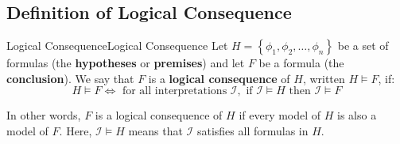 \documentclass[a4paper]{article}
\theoremstyle{definition}
\begin{document}
\subsection{Definition of Logical Consequence}
\begin{definition}{Logical Consequence}{Logical Consequence}
Let \( H = \left\{ \phi_1, \phi_2, \ldots, \phi_n \right\} \) be a set of formulas (the \textbf{hypotheses} or \textbf{premises}) and let 
\( F \) be a formula (the \textbf{conclusion}). We say that \( F \) is a \textbf{logical consequence} of \( H \), written \( H \models F \), if:
\[
  H \models F \Leftrightarrow \text{ for all interpretations } \mathcal{I}, \text{ if } \mathcal{I} \models H \text{ then } \mathcal{I} \models F
\]
\end{definition}
In other words, \( F \) is a logical consequence of \( H \) if every model of \( H \) is also a model of \( F \). Here, \( \mathcal{I} \models H \)
means that \( \mathcal{I} \) satisfies all formulas in \( H \).
\end{document}
